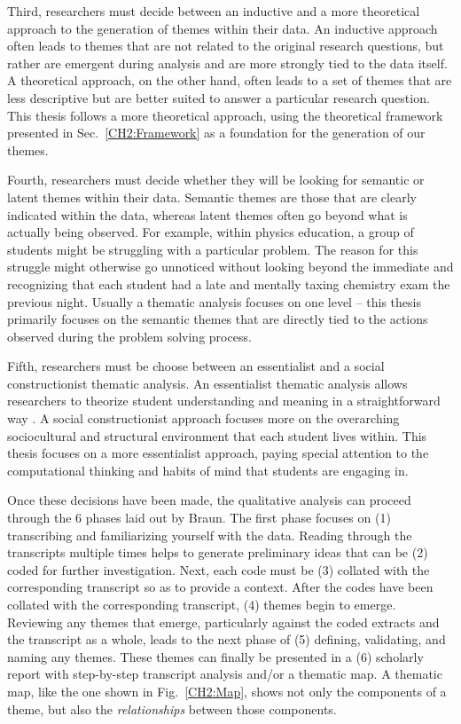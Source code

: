 \documentclass{msuphddissertation}
\begin{document}
\begin{doublespace}
Third, researchers must decide between an inductive and a more theoretical approach to the generation of themes within their data.  An inductive approach often leads to themes that are not related to the original research questions, but rather are emergent during analysis and are more strongly tied to the data itself.  A theoretical approach, on the other hand, often leads to a set of themes that are less descriptive but are better suited to answer a particular research question.  This thesis follows a more theoretical approach, using the theoretical framework presented in Sec.~\ref{CH2:Framework} as a foundation for the generation of our themes.  %

Fourth, researchers must decide whether they will be looking for semantic or latent themes within their data.  Semantic themes are those that are clearly indicated within the data, whereas latent themes often go beyond what is actually being observed.  For example, within physics education, a group of students might be struggling with a particular problem.  The reason for this struggle might otherwise go unnoticed without looking beyond the immediate and recognizing that each student had a late and mentally taxing chemistry exam the previous night.  Usually a thematic analysis focuses on one level -- this thesis primarily focuses on the semantic themes that are directly tied to the actions observed during the problem solving process.

Fifth, researchers must be choose between an essentialist and a social constructionist thematic analysis.  An essentialist thematic analysis allows researchers to theorize student understanding and meaning in a straightforward way \cite{Potter1997,Widdicombe1995}.  A social constructionist approach focuses more on the overarching sociocultural and structural environment that each student lives within.  This thesis focuses on a more essentialist approach, paying special attention to the computational thinking and habits of mind that students are engaging in.

Once these decisions have been made, the qualitative analysis can proceed through the $6$ phases laid out by Braun.  The first phase focuses on (1) transcribing and familiarizing yourself with the data.  Reading through the transcripts multiple times helps to generate preliminary ideas that can be (2) coded for further investigation.  Next, each code must be (3) collated with the corresponding transcript so as to provide a context.  After the codes have been collated with the corresponding transcript, (4) themes begin to emerge.  Reviewing any themes that emerge, particularly against the coded extracts and the transcript as a whole, leads to the next phase of (5) defining, validating, and naming any themes.  These themes can finally be presented in a (6) scholarly report with step-by-step transcript analysis and/or a thematic map.  A thematic map, like the one shown in Fig.~\ref{CH2:Map}, shows not only the components of a theme, but also the \textit{relationships} between those components.


\end{doublespace}
\end{document}
